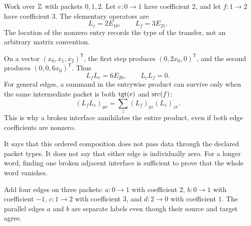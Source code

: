 
Work over $\mathbb Z$ with packets $0,1,2$. Let $e:0\to1$ have coefficient $2$, and let $f:1\to2$ have coefficient $3$. The elementary operators are
\[
L_e=2E_{10},\qquad L_f=3E_{21}.
\]
The location of the nonzero entry records the type of the transfer, not an arbitrary matrix convention.


On a vector $(x_0,x_1,x_2)^\mathsf T$, the first step produces $(0,2x_0,0)^\mathsf T$, and the second produces $(0,0,6x_0)^\mathsf T$. Thus
\[
L_fL_e=6E_{20},\qquad L_eL_f=0.
\]
For general edges, a summand in the entrywise product can survive only when the same intermediate packet is both $\operatorname{tgt}(e)$ and $\operatorname{src}(f)$:
\[
(L_fL_e)_{yx}=\sum_z(L_f)_{yz}(L_e)_{zx}.
\]
This is why a broken interface annihilates the entire product, even if both edge coefficients are nonzero.

It says that this ordered composition does not pass data through the declared packet types. It does not say that either edge is individually zero. For a longer word, finding one broken adjacent interface is sufficient to prove that the whole word vanishes.


Add four edges on three packets: $a:0\to1$ with coefficient $2$, $b:0\to1$ with coefficient $-1$, $c:1\to2$ with coefficient $3$, and $d:2\to0$ with coefficient $1$. The parallel edges $a$ and $b$ are separate labels even though their source and target agree.


